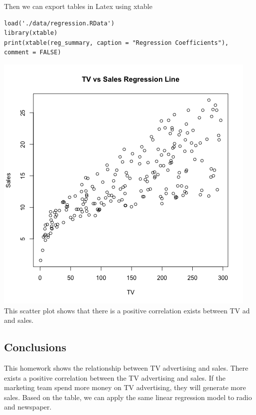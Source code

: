 \documentclass[]{article}
\begin{document}
Then we can export tables in Latex using xtable

\begin{verbatim}
load('./data/regression.RData')
library(xtable)
print(xtable(reg_summary, caption = "Regression Coefficients"), comment = FALSE)
\end{verbatim}

\includegraphics{./images/scatterplot-tv-sales.png} This scatter plot
shows that there is a positive correlation exists between TV ad and
sales.

\subsection{Conclusions}\label{conclusions}

This homework shows the relationship between TV advertising and sales.
There exists a positive correlation between the TV advertising and
sales. If the marketing team spend more money on TV advertising, they
will generate more sales. Based on the table, we can apply the same
linear regression model to radio and newspaper.
\end{document}
